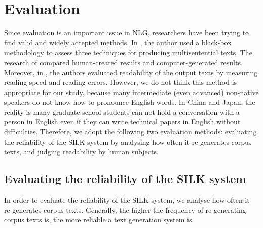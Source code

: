 \documentclass[english]{jnlp_1.2.0}
\begin{document}
\section{Evaluation}

Since evaluation is an important issue in NLG, researchers have been 
trying to find valid and widely accepted methods. In
\cite{Coch96}, the author used a black-box methodology to assess three
techniques for producing multisentential texts. The research of \cite{Yeh97}
compared human-created results and computer-generated results.
Moreover, in \cite{Will03,Williams04}, the authors evaluated readability of the output
texts by measuring reading speed and reading errors. However, we do not think
this method is appropriate for our study, because many intermediate
(even advanced) non-native speakers do not know how to pronounce
English words. In China and Japan, the reality is many graduate school
students can not hold a conversation with a person in English even if they can write 
technical papers in English without difficulties. Therefore,
we adopt the following two evaluation methods: evaluating 
the reliability of the SILK system by analysing how often 
it re-generates corpus texts, and judging readability by human subjects.

\subsection{Evaluating the reliability of the SILK system}

In order to evaluate the reliability of the SILK system, 
we analyse how often it re-generates corpus texts.
Generally, the higher the frequency of re-generating corpus texts is,
the more reliable a text generation system is.
\end{document}
